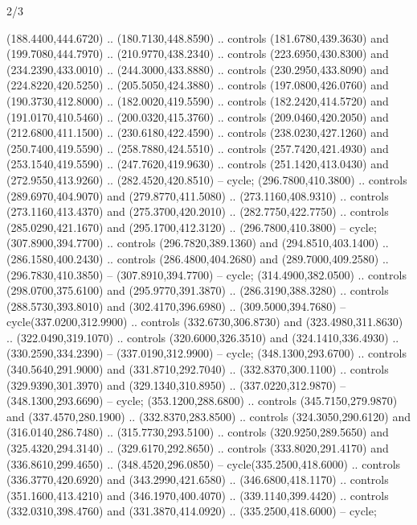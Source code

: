 \begin{flagdescription}{2/3}
\begin{scope}[xshift=0.5\flaglength,yshift=0.5\flagwidth,scale=\flagwidth/255]
\begin{scope}[y=-0.43pt, x=0.43pt,xshift=-193pt,yshift=133pt]
\begin{scope}[draw=black,line width=0.003\flagwidth]
\begin{scope}[fill=white]
  (188.4400,444.6720) .. (180.7130,448.8590) .. controls (181.6780,439.3630) and
  (199.7080,444.7970) .. (210.9770,438.2340) .. controls (223.6950,430.8300) and
  (234.2390,433.0010) .. (244.3000,433.8880) .. controls (230.2950,433.8090) and
  (224.8220,420.5250) .. (205.5050,424.3880) .. controls (197.0800,426.0760) and
  (190.3730,412.8000) .. (182.0020,419.5590) .. controls (182.2420,414.5720) and
  (191.0170,410.5460) .. (200.0320,415.3760) .. controls (209.0460,420.2050) and
  (212.6800,411.1500) .. (230.6180,422.4590) .. controls (238.0230,427.1260) and
  (250.7400,419.5590) .. (258.7880,424.5510) .. controls (257.7420,421.4930) and
  (253.1540,419.5590) .. (247.7620,419.9630) .. controls (251.1420,413.0430) and
  (272.9550,413.9260) .. (282.4520,420.8510) -- cycle;
 (296.7800,410.3800) .. controls (289.6970,404.9070) and
  (279.8770,411.5080) .. (273.1160,408.9310) .. controls (273.1160,413.4370) and
  (275.3700,420.2010) .. (282.7750,422.7750) .. controls (285.0290,421.1670) and
  (295.1700,412.3120) .. (296.7800,410.3800) -- cycle;
 (307.8900,394.7700) .. controls (296.7820,389.1360) and
  (294.8510,403.1400) .. (286.1580,400.2430) .. controls (286.4800,404.2680) and
  (289.7000,409.2580) .. (296.7830,410.3850) -- (307.8910,394.7700) -- cycle;
 (314.4900,382.0500) .. controls (298.0700,375.6100) and
  (295.9770,391.3870) .. (286.3190,388.3280) .. controls (288.5730,393.8010) and
  (302.4170,396.6980) .. (309.5000,394.7680) -- cycle(337.0200,312.9900) ..
  controls (332.6730,306.8730) and (323.4980,311.8630) .. (322.0490,319.1070) ..
  controls (320.6000,326.3510) and (324.1410,336.4930) .. (330.2590,334.2390) --
  (337.0190,312.9900) -- cycle;
 (348.1300,293.6700) .. controls (340.5640,291.9000) and
  (331.8710,292.7040) .. (332.8370,300.1100) .. controls (329.9390,301.3970) and
  (329.1340,310.8950) .. (337.0220,312.9870) -- (348.1300,293.6690) -- cycle;
 (353.1200,288.6800) .. controls (345.7150,279.9870) and
  (337.4570,280.1900) .. (332.8370,283.8500) .. controls (324.3050,290.6120) and
  (316.0140,286.7480) .. (315.7730,293.5100) .. controls (320.9250,289.5650) and
  (325.4320,294.3140) .. (329.6170,292.8650) .. controls (333.8020,291.4170) and
  (336.8610,299.4650) .. (348.4520,296.0850) -- cycle(335.2500,418.6000) ..
  controls (336.3770,420.6920) and (343.2990,421.6580) .. (346.6800,418.1170) ..
  controls (351.1600,413.4210) and (346.1970,400.4070) .. (339.1140,399.4420) ..
  controls (332.0310,398.4760) and (331.3870,414.0920) .. (335.2500,418.6000) --
  cycle;

\end{scope}
\end{scope}
\end{scope}
\end{scope}
\end{flagdescription}

